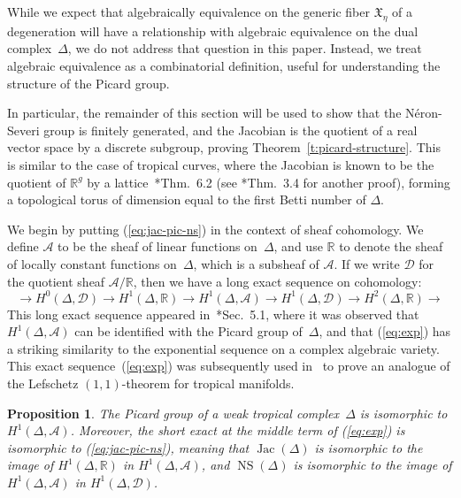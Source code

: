 \documentclass[11pt,reqno]{amsart}
\newtheorem{prop}[thm]{Proposition}
\theoremstyle{definition}
\newcommand{\cA}{\mathcal A}
\newcommand{\cD}{\mathcal D}
\newcommand{\Jac}{\operatorname{Jac}}
\newcommand{\NS}{\operatorname{NS}}
\newcommand{\RR}{\mathbb R}
\newcommand{\X}{\mathfrak X}
\begin{document}
While we expect that algebraically equivalence on the generic fiber $\X_\eta$ of
a degeneration will have a relationship with algebraic equivalence on the dual
complex~$\Delta$, we do not address that question in this paper. Instead, we
treat algebraic equivalence as a combinatorial definition, useful for
understanding the structure of the Picard group.

In particular, the remainder of this section will be used to show that the
N\'eron-Severi group is finitely generated, and the Jacobian is the quotient of
a real vector space by a discrete subgroup, proving
Theorem~\ref{t:picard-structure}. This is similar to the case of tropical
curves, where the Jacobian is known to be the quotient of $\RR^g$ by a
lattice~\cite{mikhalkin-zharkov}*{Thm.~6.2} (see \cite{baker-faber}*{Thm.~3.4}
for another proof), forming a topological torus of dimension equal to the first
Betti number of $\Delta$.

We begin by putting (\ref{eq:jac-pic-ns}) in the context of sheaf cohomology. We
define $\cA$ to be the sheaf of linear functions on~$\Delta$, and use $\RR$ to
denote the sheaf of locally constant functions on~$\Delta$, which is a subsheaf
of $\cA$. If we write $\cD$ for the quotient sheaf $\cA/\RR$, then we have a
long exact sequence on cohomology:
\begin{equation}\label{eq:exp}
\rightarrow
H^0(\Delta, \cD) \rightarrow H^1(\Delta, \RR) \rightarrow
H^1(\Delta, \cA) \rightarrow H^1(\Delta, \cD) \rightarrow
H^2(\Delta, \RR) \rightarrow
\end{equation}
This long exact sequence appeared in~\cite{mikhalkin-zharkov}*{Sec.~5.1},
where it was observed that $H^1(\Delta, \cA)$ can be identified with the Picard
group of~$\Delta$, and that (\ref{eq:exp}) has a striking similarity to the
exponential sequence on a complex algebraic variety. This exact
sequence~(\ref{eq:exp}) was subsequently used in~\cite{jell-rau-shaw} to prove
an analogue of the Lefschetz $(1,1)$-theorem for tropical manifolds.

\begin{prop}\label{p:picard-cohomology}
The Picard group of a weak tropical complex~$\Delta$ is isomorphic to
$H^1(\Delta, \cA)$. Moreover, the short exact at the middle term of
(\ref{eq:exp}) is isomorphic to (\ref{eq:jac-pic-ns}), meaning that
$\Jac(\Delta)$ is isomorphic to the image of $H^1(\Delta, \RR)$ in $H^1(\Delta,
\cA)$, and $\NS(\Delta)$ is isomorphic to the image of $H^1(\Delta, \cA)$ in
$H^1(\Delta, \cD)$.
\end{prop}
\end{document}
